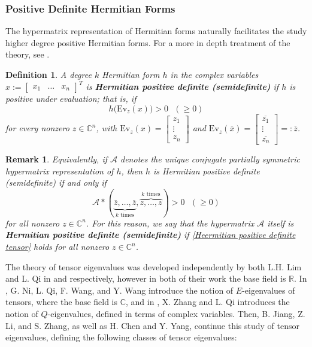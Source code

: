 \documentclass[11pt]{article}
\newtheorem{defn}[theorem]{Definition}
\newtheorem{remark}[theorem]{Remark}
\begin{document}
\subsubsection{Positive Definite Hermitian Forms}
The hypermatrix representation of Hermitian forms naturally facilitates the study higher degree positive Hermitian forms. For a more in depth treatment of the theory, see \cite{chen2025hat}. 
\begin{defn}\label{Hermitian positive definite form - classical}
    A degree $k$ Hermitian form $h$ in the complex variables $x := \left[\begin{array}{ccc}
        x_1 & \dots & x_n 
    \end{array}\right]^T$ is \textbf{Hermitian positive definite (semidefinite)} if $h$ is positive under evaluation; that is, if 
    \[h\big(\mathrm{Ev}_z(x)\big) > 0\text{ $(\geq 0)$}\]
    for every nonzero $z\in \mathbb{C}^n$, with $\mathrm{Ev}_z(x) = \left[\begin{array}{c}
        z_1 \\
        \vdots \\
        z_n
    \end{array}\right]$ and $\mathrm{Ev}_z(\overline{x}) = \left[\begin{array}{c}
        \overline{z_1} \\
        \vdots \\
        \overline{z_n}
    \end{array}\right] =: \overline{z}$. 
\end{defn}
\begin{remark}
    Equivalently, if $\mathcal{A}$ denotes the unique conjugate partially symmetric hypermatrix representation of $h$, then $h$ is Hermitian positive definite (semidefinite) if and only if 
    \begin{equation}\label{Heermitian positive definite tensor}
        \mathcal{A}*(\underbrace{\overline{z},\dots,\overline{z}}_{k\text{ times}},\overbrace{z,\dots,z}^{k\text{ times}}) > 0\text{ $(\geq 0)$}
    \end{equation}
    for all nonzero $z\in \mathbb{C}^n$. 
    For this reason, we say that the hypermatrix $\mathcal{A}$ itself is \textbf{Hermitian positive definite (semidefinite)} if \eqref{Heermitian positive definite tensor} holds for all nonzero $z\in \mathbb{C}^n$. 
\end{remark}
The theory of tensor eigenvalues was developed independently by both L.H. Lim and L. Qi in \cite[2005]{lim2005singular} and \cite[2005]{qi2005eigenvalues} respectively, however in both of their work the base field is $\mathbb{R}$. In \cite[2007]{ni2007degree}, G. Ni, L. Qi, F. Wang, and Y. Wang introduce the notion of $E$-eigenvalues of tensors, where the base field is $\mathbb{C}$, and in \cite{zhang2012quantum}, X. Zhang and L. Qi introduces the notion of $Q$-eigenvalues, defined in terms of complex variables. Then, B. Jiang, Z. Li, and S. Zhang, as well as H. Chen and Y. Yang, continue this study of tensor eigenvalues, defining the following classes of tensor eigenvalues: 
\end{document}
